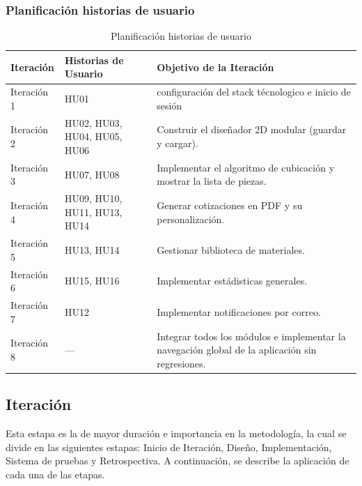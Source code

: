 ﻿\documentclass{iccmemoria}
\begin{document}
\subsubsection{Planificación historias de usuario}
\begin{table}[H]
    \centering
    \caption{Planificación historias de usuario}
    \label{tab:planificacion_historias_de_usuario} 
    
    \begin{tabular}{|p{2cm}|p{5cm}|p{7cm}|} 
        \hline %
        
        \textbf{Iteración} & \textbf{Historias de Usuario} & \textbf{Objetivo de la Iteración}\\
        \hline %
        
Iteración 1 & HU01 & configuración del stack técnologico e inicio de sesión\\
\hline
Iteración 2 &  HU02, HU03, HU04, HU05, HU06 & Construir el diseñador 2D modular (guardar y cargar).\\
\hline
Iteración 3 & HU07, HU08 & Implementar el algoritmo de cubicación y mostrar la lista de piezas. \\
\hline
Iteración 4 & HU09, HU10, HU11, HU13, HU14 & Generar cotizaciones en PDF y su personalización.\\
\hline
Iteración 5 & HU13, HU14 & Gestionar biblioteca de materiales.\\
\hline
Iteración 6 & HU15, HU16 & Implementar estádisticas generales.\\
\hline
Iteración 7 & HU12 & Implementar notificaciones por correo.\\
\hline
Iteración 8 & — & Integrar todos los módulos e implementar la navegación global de la aplicación sin regresiones.\\
        \hline %
    \end{tabular}
\end{table}
\subsection{Iteración}
Esta estapa es la de mayor duración e importancia en la metodología, la cual se divide en las siguientes estapas: Inicio de Iteración, Diseño, Implementación, Sistema de pruebas y Retrospectiva. A continuación, se describe la aplicación de cada una de las etapas.
\end{document}
